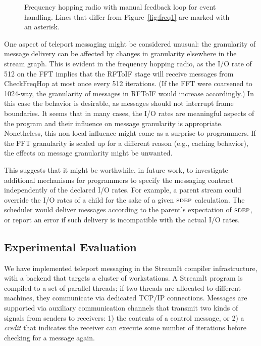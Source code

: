 %
\begin{figure}[t]
\centering
\vspace{-26pt}
\hspace{-0.2in}
\vspace{-10pt}
\caption[Code for frequency hopping radio with manual control
  messages.]{Frequency hopping radio with manual feedback loop
  for event handling.  Lines that differ from Figure~\ref{fig:freq1}
  are marked with an asterisk. \protect\label{fig:freq2}}
\vspace{-12pt}
\end{figure}
\clearpage
%
One aspect of teleport messaging might be considered unusual: the
granularity of message delivery can be affected by changes in
granularity elsewhere in the stream graph.  This is evident in the
frequency hopping radio, as the I/O rate of 512 on the FFT implies
that the RFToIF stage will receive messages from CheckFreqHop at most
once every 512 iterations.  (If the FFT were coarsened to 1024-way,
the granularity of messages in RFToIF would increase accordingly.)  In
this case the behavior is desirable, as messages should not interrupt
frame boundaries.  It seems that in many cases, the I/O rates are
meaningful aspects of the program and their influence on message
granularity is appropriate.  Nonetheless, this non-local influence
might come as a surprise to programmers.  If the FFT granularity is
scaled up for a different reason (e.g., caching behavior), the effects
on message granularity might be unwanted.

This suggests that it might be worthwhile, in future work, to
investigate additional mechanisms for programmers to specify the
messaging contract independently of the declared I/O rates.  For
example, a parent stream could override the I/O rates of a child for
the sake of a given $\textsc{sdep}$ calculation.  The scheduler would deliver
messages according to the parent's expectation of $\textsc{sdep}$, or report
an error if such delivery is incompatible with the actual I/O rates.

\subsection*{Experimental Evaluation}
\label{sec:evaluation}

We have implemented teleport messaging in the StreamIt compiler
infrastructure, with a backend that targets a cluster of workstations.
A StreamIt program is compiled to a set of parallel threads; if two
threads are allocated to different machines, they communicate via
dedicated TCP/IP connections.  Messages are supported via auxiliary
communication channels that transmit two kinds of signals from senders
to receivers: 1) the contents of a control message, or 2) a {\it
credit} that indicates the receiver can execute some number of
iterations before checking for a message again.

